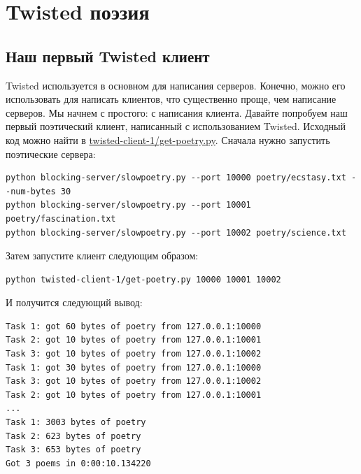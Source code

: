 
\section{Twisted поэзия\label{sec:part4}}

\subsection{Наш первый Twisted клиент}

Twisted используется в основном для написания серверов. 
Конечно, можно его использовать для написать клиентов, 
что существенно проще, чем написание серверов. Мы начнем с 
простого: с написания клиента. 
Давайте попробуем наш первый поэтический клиент, 
написанный с использованием Twisted. Исходный код  
можно найти в 
\href{http://github.com/jdavisp3/twisted-intro/blob/master/twisted-client-1/get-poetry.py}{twisted-client-1/get-poetry.py}. Сначала нужно запустить поэтические сервера:

\begin{scriptsize}\begin{verbatim}
python blocking-server/slowpoetry.py --port 10000 poetry/ecstasy.txt --num-bytes 30
python blocking-server/slowpoetry.py --port 10001 poetry/fascination.txt
python blocking-server/slowpoetry.py --port 10002 poetry/science.txt
\end{verbatim}\end{scriptsize}

Затем запустите клиент следующим образом:

\begin{scriptsize}\begin{verbatim}
python twisted-client-1/get-poetry.py 10000 10001 10002
\end{verbatim}\end{scriptsize}

И получится следующий вывод:

\begin{scriptsize}\begin{verbatim}
Task 1: got 60 bytes of poetry from 127.0.0.1:10000
Task 2: got 10 bytes of poetry from 127.0.0.1:10001
Task 3: got 10 bytes of poetry from 127.0.0.1:10002
Task 1: got 30 bytes of poetry from 127.0.0.1:10000
Task 3: got 10 bytes of poetry from 127.0.0.1:10002
Task 2: got 10 bytes of poetry from 127.0.0.1:10001
...
Task 1: 3003 bytes of poetry
Task 2: 623 bytes of poetry
Task 3: 653 bytes of poetry
Got 3 poems in 0:00:10.134220
\end{verbatim}\end{scriptsize}

